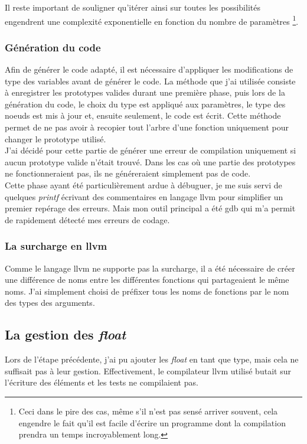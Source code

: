 \documentclass[12pt]{article}
\begin{document}
Il reste important de souligner qu'itérer ainsi sur toutes les possibilités
engendrent une complexité exponentielle en fonction du nombre de paramètres
\footnote{Ceci dans le pire des cas, même s'il n'est pas sensé arriver
souvent, cela engendre le fait qu'il est facile d'écrire un programme dont
la compilation prendra un temps incroyablement long.}.

\subsubsection{Génération du code}
Afin de générer le code adapté, il est nécessaire d'appliquer les
modifications de type des variables avant de générer le code. La méthode
que j'ai utilisée consiste à enregistrer les prototypes valides durant une
première phase, puis lors de la génération du code, le choix du type est
appliqué aux paramètres, le type des noeuds est mis à jour et, ensuite
seulement, le code est écrit. Cette méthode permet de ne pas avoir à recopier
tout l'arbre d'une fonction uniquement pour changer le prototype utilisé.\\

J'ai décidé pour cette partie de générer une erreur de compilation uniquement
si aucun prototype valide n'était trouvé. Dans les cas où une partie des
prototypes ne fonctionneraient pas, ils ne généreraient simplement pas de code.\\

Cette phase ayant été particulièrement ardue à débuguer, je me suis servi de
quelques {\em printf} écrivant des commentaires en langage llvm pour simplifier
un premier repérage des erreurs. Mais mon outil principal a été gdb qui m'a
permit de rapidement détecté mes erreurs de codage.

\subsubsection{La surcharge en llvm}
Comme le langage llvm ne supporte pas la surcharge, il a été nécessaire de
créer une différence de noms entre les différentes fonctions qui partageaient
le même noms. J'ai simplement choisi de préfixer tous les noms de fonctions
par le nom des types des arguments.

\subsection{La gestion des {\em float}}
Lors de l'étape précédente, j'ai pu ajouter les {\em float} en tant que
type, mais cela ne suffisait pas à leur gestion. Effectivement, le
compilateur llvm utilisé butait sur l'écriture des éléments et les tests ne
compilaient pas.\\
\end{document}
